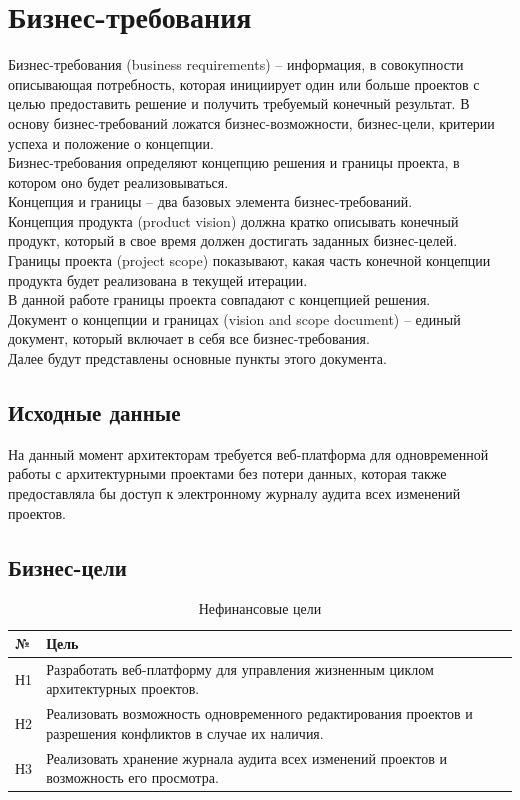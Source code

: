 \documentclass[a4paper,14pt]{extreport} %
\begin{document}
\newpage
\section{Бизнес-требования}

Бизнес-требования (business requirements) -- информация, в совокупности описывающая потребность, которая инициирует один или больше проектов с целью предоставить решение и получить требуемый конечный результат. В основу бизнес-требований ложатся бизнес-возможности, бизнес-цели, критерии успеха и положение о концепции. \\
Бизнес-требования определяют концепцию решения и границы проекта, в котором оно будет реализовываться. \\
Концепция и границы -- два базовых элемента бизнес-требований. \\ Концепция продукта (product vision) должна кратко описывать конечный продукт, который в свое время должен достигать заданных бизнес-целей. \\
Границы проекта (project scope) показывают, какая часть конечной концепции продукта будет реализована в текущей итерации. \\
В данной работе границы проекта совпадают с концепцией решения. \\
Документ о концепции и границах (vision and scope document) -- единый документ, который включает в себя все бизнес-требования. \\
Далее будут представлены основные пункты этого документа.

\subsection{Исходные данные}

На данный момент архитекторам требуется веб-платформа для одновременной работы с архитектурными проектами без потери данных, которая также предоставляла бы доступ к электронному журналу аудита всех изменений проектов.

\newpage
\subsection{Бизнес-цели}

\begin{table}[H]
\caption {Нефинансовые цели} \label{tab:title}
\begin{center}
\begin{tabular}{ | l | p{14cm} | }
\hline
№ & Цель \\
\hline
Н1 & Разработать веб-платформу для управления жизненным циклом	архитектурных проектов. \\
\hline
Н2 & Реализовать возможность одновременного редактирования проектов и разрешения конфликтов в случае их наличия. \\
\hline
Н3 & Реализовать хранение журнала аудита всех изменений проектов и возможность его просмотра. \\
\hline
\end{tabular}
\end{center}
\end{table}
 
\end{document}
